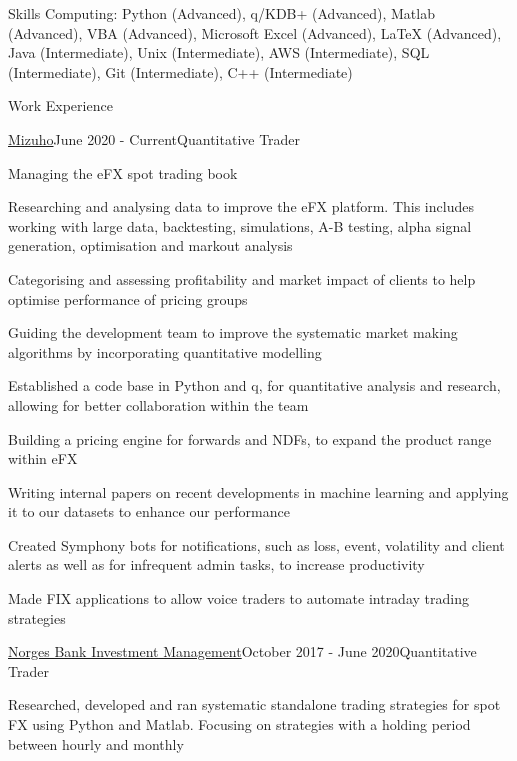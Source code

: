 \documentclass{resume} %
\begin{document}
\begin{rSection}{Skills}
	Computing: Python (Advanced), q/KDB+ (Advanced), Matlab (Advanced), VBA (Advanced), Microsoft Excel (Advanced), LaTeX (Advanced), Java (Intermediate), Unix (Intermediate), AWS (Intermediate), SQL (Intermediate), Git (Intermediate), C++ (Intermediate)
\end{rSection}
\begin{rSection}{Work Experience}
\begin{rSubsection}{\href{https://www.mizuhogroup.com/bank/}{Mizuho}}{June 2020 - Current}{Quantitative Trader}{}
	\item Managing the eFX spot trading book
	\item Researching and analysing data to improve the eFX platform. This includes working with large data, backtesting, simulations, A-B testing, alpha signal generation, optimisation and markout analysis 
	\item Categorising and assessing profitability and market impact of clients to help optimise performance of pricing groups	 
	\item Guiding the development team to improve the systematic market making algorithms by incorporating quantitative modelling
	\item Established a code base in Python and q, for quantitative analysis and research, allowing for better collaboration within the team		
	\item Building a pricing engine for forwards and NDFs, to expand the product range within eFX
	\item Writing internal papers on recent developments in machine learning and applying it to our datasets to enhance our performance
	\item Created Symphony bots for notifications, such as loss, event, volatility and client alerts as well as for infrequent admin tasks, to increase productivity
	\item Made FIX applications to allow voice traders to automate intraday trading strategies
\end{rSubsection}
\begin{rSubsection}{\href{https://www.nbim.no/}{Norges Bank Investment Management}}{October 2017 - June 2020}{Quantitative Trader}{}
	\item Researched, developed and ran systematic standalone trading strategies for spot FX using Python and Matlab. Focusing on strategies with a holding period between hourly and monthly

\end{rSubsection}
\end{rSection}
\end{document}
